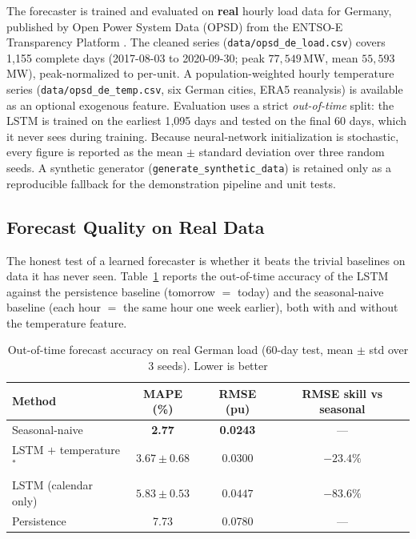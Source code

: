The forecaster is trained and evaluated on \textbf{real} hourly load data for Germany, published by Open Power System Data (OPSD) from the ENTSO-E Transparency Platform \cite{opsd2020timeseries}. The cleaned series (\texttt{data/opsd\_de\_load.csv}) covers 1{,}155 complete days (2017-08-03 to 2020-09-30; peak $77{,}549$\,MW, mean $55{,}593$\,MW), peak-normalized to per-unit. A population-weighted hourly temperature series (\texttt{data/opsd\_de\_temp.csv}, six German cities, ERA5 reanalysis) is available as an optional exogenous feature. Evaluation uses a strict \emph{out-of-time} split: the LSTM is trained on the earliest 1{,}095 days and tested on the final 60 days, which it never sees during training. Because neural-network initialization is stochastic, every figure is reported as the mean $\pm$ standard deviation over three random seeds. A synthetic generator (\texttt{generate\_synthetic\_data}) is retained only as a reproducible fallback for the demonstration pipeline and unit tests.

\subsection{Forecast Quality on Real Data}
\label{sec:forecast_quality}

The honest test of a learned forecaster is whether it beats the trivial baselines on data it has never seen. Table~\ref{tab:forecast_metrics} reports the out-of-time accuracy of the LSTM against the persistence baseline (tomorrow $=$ today) and the seasonal-naive baseline (each hour $=$ the same hour one week earlier), both with and without the temperature feature.

\begin{table}[H]
\centering
\caption{Out-of-time forecast accuracy on real German load (60-day test, mean $\pm$ std over 3 seeds). Lower is better}
\label{tab:forecast_metrics}
\begin{tabular}{lccc}
\toprule
\textbf{Method} & \textbf{MAPE (\%)} & \textbf{RMSE (pu)} & \textbf{RMSE skill vs seasonal} \\
\midrule
Seasonal-naive             & \textbf{2.77} & \textbf{0.0243} & --- \\
LSTM $+$ temperature$^{*}$ & $3.67 \pm 0.68$ & $0.0300$ & $-23.4\%$ \\
LSTM (calendar only)       & $5.83 \pm 0.53$ & $0.0447$ & $-83.6\%$ \\
Persistence                & 7.73 & 0.0780 & --- \\
\bottomrule
\end{tabular}
\end{table}

